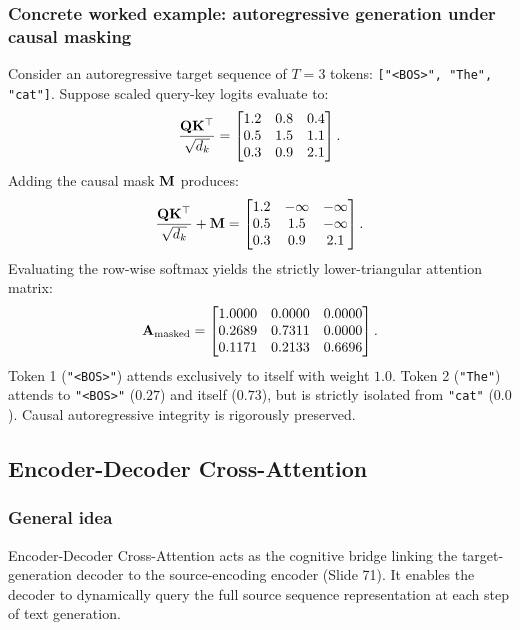 \documentclass[../../../main.tex]{subfiles}
\begin{document}
\subsubsection{Concrete worked example: autoregressive generation under causal masking}
Consider an autoregressive target sequence of $T = 3$ tokens: \texttt{["<BOS>", "The", "cat"]}.
Suppose scaled query-key logits evaluate to:
\begin{equation}
\frac{\mathbf{Q} \mathbf{K}^\top}{\sqrt{d_k}} = \begin{bmatrix}
1.2 & 0.8 & 0.4 \\
0.5 & 1.5 & 1.1 \\
0.3 & 0.9 & 2.1
\end{bmatrix}.
\end{equation}
Adding the causal mask $\mathbf{M}$ produces:
\begin{equation}
\frac{\mathbf{Q} \mathbf{K}^\top}{\sqrt{d_k}} + \mathbf{M} = \begin{bmatrix}
1.2 & -\infty & -\infty \\
0.5 & 1.5 & -\infty \\
0.3 & 0.9 & 2.1
\end{bmatrix}.
\end{equation}
Evaluating the row-wise softmax yields the strictly lower-triangular attention matrix:
\begin{equation}
\mathbf{A}_{\text{masked}} = \begin{bmatrix}
1.0000 & 0.0000 & 0.0000 \\
0.2689 & 0.7311 & 0.0000 \\
0.1171 & 0.2133 & 0.6696
\end{bmatrix}.
\end{equation}
Token 1 (\texttt{"<BOS>"}) attends exclusively to itself with weight $1.0$. Token 2 (\texttt{"The"}) attends to \texttt{"<BOS>"} ($0.27$) and itself ($0.73$), but is strictly isolated from \texttt{"cat"} ($0.0$). Causal autoregressive integrity is rigorously preserved.

\subsection{Encoder-Decoder Cross-Attention}
\label{subsec:encoder_decoder_cross_attn}

\subsubsection{General idea}
Encoder-Decoder Cross-Attention acts as the cognitive bridge linking the target-generation decoder to the source-encoding encoder (Slide 71). It enables the decoder to dynamically query the full source sequence representation at each step of text generation.
\end{document}
